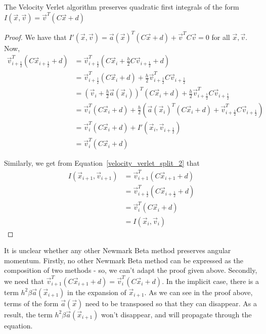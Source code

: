 \documentclass[../Main.tex]{subfiles}
\begin{document}
\begin{theorem} The Velocity Verlet algorithm preserves quadratic first integrals of the form $I(\vec{x}, \vec{v}) = \vec{v}^{T}\left(C\vec{x} + d\right)$ \end{theorem}
\begin{proof}
We have that $I'(\vec{x}, \vec{v}) = \vec{a}(\vec{x})^{T}\left(C\vec{x} + d\right) + \vec{v}^{T}C\vec{v} = 0$ for all $\vec{x}, \vec{v}$.
Now,
\begin{align*}
\vec{v}_{i+\frac{1}{2}}^{T}\left(C\vec{x}_{i+\frac{1}{2}} + d\right) &= \vec{v}_{i+\frac{1}{2}}^{T}\left(C\vec{x}_{i} + \frac{h}{2}C\vec{v}_{i+\frac{1}{2}} + d\right) \\
&= \vec{v}_{i+\frac{1}{2}}^{T}\left(C\vec{x}_{i} + d\right) + \frac{h}{2}\vec{v}_{i+\frac{1}{2}}^{T}C\vec{v}_{i+\frac{1}{2}} \\
&= \left(\vec{v}_{i} + \frac{h}{2}\vec{a}(\vec{x}_{i})\right)^{T}\left(C\vec{x}_{i} + d\right)+ \frac{h}{2}\vec{v}_{i+\frac{1}{2}}^{T}C\vec{v}_{i+\frac{1}{2}} \\
&=\vec{v}_{i}^{T}(C\vec{x}_{i} + d) + \frac{h}{2}\left( \vec{a}(\vec{x}_{i})^{T}(C\vec{x}_{i} + d) + \vec{v}_{i+\frac{1}{2}}^{T}C\vec{v}_{i+\frac{1}{2}}\right) \\
&=\vec{v}_{i}^{T}(C\vec{x}_{i} + d) + I'(\vec{x}_{i}, \vec{v}_{i+\frac{1}{2}}) \\
&=\vec{v}_{i}^{T}(C\vec{x}_{i} + d)
\end{align*}

Similarly, we get from Equation~\ref{velocity_verlet_split_2} that
\begin{align*}
I(\vec{x}_{i+1}, \vec{v}_{i+1}) &=\vec{v}_{i+1}^{T}(C\vec{x}_{i+1} + d) \\
&= \vec{v}_{i+\frac{1}{2}}^{T}\left(C\vec{x}_{i+\frac{1}{2}} + d\right) \\
&=\vec{v}_{i}^{T}(C\vec{x}_{i} + d) \\
&= I(\vec{x}_{i}, \vec{v}_{i})
\end{align*}
\end{proof}

It is unclear whether any other Newmark Beta method preserves angular momentum. Firstly, no other Newmark Beta method can be expressed as the composition of two methods - so, we can't adapt the proof given above. Secondly, we need that $\vec{v}_{i+1}^{T}(C\vec{x}_{i+1} + d)=\vec{v}_{i}^{T}(C\vec{x}_{i} + d)$. In the implicit case, there is a term $h^{2}\beta\vec{a}(\vec{x}_{i+1})$ in the expansion of $\vec{x}_{i+1}$. As we can see in the proof above, terms of the form $\vec{a}(\vec{x})$ need to be transposed so that they can disappear. As a result, the term $h^{2}\beta\vec{a}(\vec{x}_{i+1})$ won't disappear, and will propagate through the equation.
\end{document}
